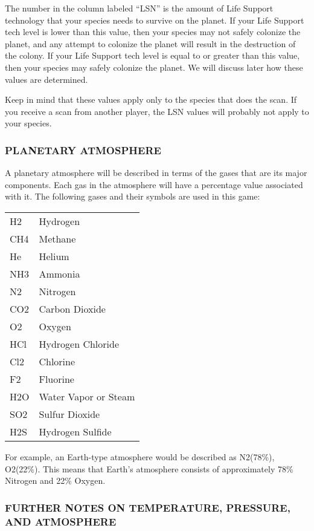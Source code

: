\documentclass[10pt,titlepage]{article}
\begin{document}
The number in the column labeled ``LSN'' is the amount of Life Support technology
that your species needs to survive on the planet.  If your Life Support tech
level is lower than this value, then your species may not safely colonize the
planet, and any attempt to colonize the planet will result in the destruction
of the colony.  If your Life Support tech level is equal to or greater than
this value, then your species may safely colonize the planet.  We will discuss
later how these values are determined.

Keep in mind that these values apply only to the species that does the scan.
If you receive a scan from another player, the LSN values will probably not
apply to your species.


\subsubsection{PLANETARY ATMOSPHERE}

A planetary atmosphere will be described in terms of the gases that are its
major components.  Each gas in the atmosphere will have a percentage value
associated with it.  The following gases and their symbols are used in this
game:
\begin{tabular}{ll}
		H2	&Hydrogen \\
		CH4	&Methane \\
		He	&Helium \\
		NH3	&Ammonia \\
		N2	&Nitrogen \\
		CO2	&Carbon Dioxide \\
		O2	&Oxygen \\
		HCl	&Hydrogen Chloride \\
		Cl2	&Chlorine \\
		F2	&Fluorine \\
		H2O	&Water Vapor or Steam \\
		SO2	&Sulfur Dioxide \\
		H2S	&Hydrogen Sulfide \\
\end{tabular}
For example, an Earth-type atmosphere would be described as N2(78\%), O2(22\%).
This means that Earth's atmosphere consists of approximately 78\% Nitrogen and
22\% Oxygen.


\subsubsection{FURTHER NOTES ON TEMPERATURE, PRESSURE, AND ATMOSPHERE}
\end{document}
